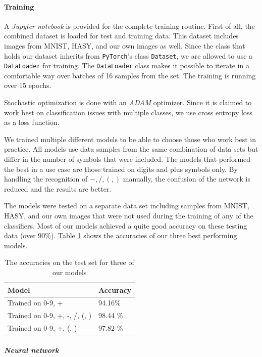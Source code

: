 \documentclass[11pt]{article}
\begin{document}
		
	\paragraph{Training}
		A \textit{Jupyter notebook} is provided for the complete training routine. First of all, the combined dataset is loaded for test and training data. This dataset includes images from MNIST, HASY, and our own images as well. Since the class that holds our dataset inherits from \texttt{PyTorch}'s class \texttt{Dataset}, we are allowed to use a \texttt{DataLoader} for training. The \texttt{DataLoader} class makes it possible to iterate in a comfortable way over batches of 16 samples from the set. The training is running over 15 epochs.
		
		Stochastic optimization is done with an \textit{ADAM}\cite{adam} optimizer. Since it is claimed to work best on classification issues with multiple classes, we use cross entropy loss as a loss function.
		
		We trained multiple different models to be able to choose those who work best in practice. All models use data samples from the same combination of data sets but differ in the number of symbols that were included. The models that performed the best in a use case are those trained on digits and plus symbols only. By handling the recognition of $-, /, (, )$ manually, the confusion of the network is reduced and the results are better. 
		
		The models were tested on a separate data set including samples from MNIST, HASY, and our own images that were not used during the training of any of the classifiers. Most of our models achieved a quite good accuracy on these testing data (over 90\%). Table \ref{tab:accuracies} shows the accuracies of our three best performing models.
		\begin{table}[H]
			\begin{tabular}{l|l}
				\textbf{Model} & \textbf{Accuracy} \\
				\hline
				Trained on 0-9, + & 94.16\%\\
				\hline
				Trained on 0-9, +, -, /, (, ) & 98.44 \%\\
				\hline
				Trained on 0-9, +, (, ) & 97.82 \% \\
			\end{tabular}
			\caption{The accuracies on the test set for three of our models}
			\label{tab:accuracies}
		\end{table}
				
		\subparagraph{Neural network}
		
\end{document}
